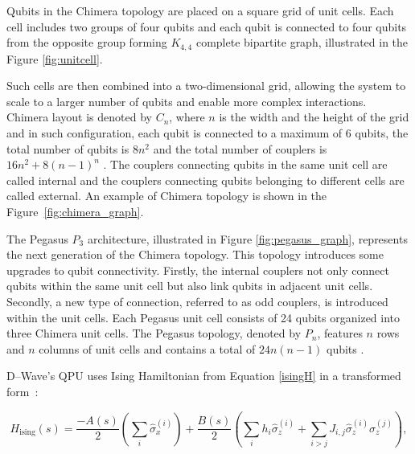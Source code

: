 \documentclass[a4paper,12pt]{article}
\begin{document}
Qubits in the Chimera topology are placed on a square grid of unit cells. Each cell includes two groups of four qubits and each qubit is connected to four qubits from the opposite group forming $K_{4,4}$ complete bipartite graph, illustrated in the Figure \ref{fig:unitcell}. 

\noindent Such cells are then combined into a two-dimensional grid, allowing the system to scale to a larger number of qubits and enable more complex interactions. Chimera layout is denoted by $C_n$, where $n$ is the width and the height of the grid and in such configuration, each qubit is connected to a maximum of 6 qubits, the total number of qubits is $8n^2$ and the total number of couplers is $16n^2 + 8(n - 1)^n$ \cite{Jałowiecki2023}. The couplers connecting qubits in the same unit cell are called internal and the couplers connecting qubits belonging to different cells are called external. An example of Chimera topology is shown in the Figure~\ref{fig:chimera_graph}.

The Pegasus $P_3$ architecture, illustrated in Figure \ref{fig:pegasus_graph}, represents the next generation of the Chimera topology. This topology introduces some upgrades to qubit connectivity. Firstly, the internal couplers not only connect qubits within the same unit cell but also link qubits in adjacent unit cells. Secondly, a new type of connection, referred to as odd couplers, is introduced within the unit cells. Each Pegasus unit cell consists of 24 qubits organized into three Chimera unit cells. The Pegasus topology, denoted by $P_n$, features $n$ rows and $n$ columns of unit cells and contains a total of $24n(n - 1)$ qubits \cite{Jałowiecki2023}.

D–Wave's QPU uses Ising Hamiltonian from Equation \eqref{isingH} in a transformed form~\cite{DWaveDocumentation}:

\begin{equation}\label{dwaveH}
    H_{\mathrm{ising}}\left(s\right)=\frac{-A\left(s\right)} 2\left(\sum _i\widehat {\sigma
}_x^{\left(i\right)}\right)+\frac{B(s)} 2\left(\sum _ih_i\widehat {\sigma }_z^{\left(i\right)}+\sum
_{i>j}J_{i,j}\widehat {\sigma }_z^{\left(i\right)}\widehat {\sigma }_z^{\left(j\right)}\right),
\end{equation}
\end{document}
